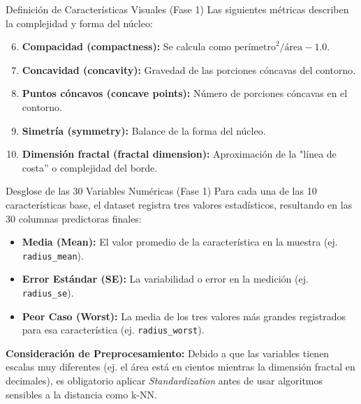 \documentclass{beamer}
\begin{document}
	\begin{frame}{Definición de Características Visuales (Fase 1)}
		Las siguientes métricas describen la complejidad y forma del núcleo:
		
		\begin{enumerate}
			\setcounter{enumi}{5}
			\item<2-> \textbf{Compacidad (compactness):} Se calcula como $\text{perímetro}^2 / \text{área} - 1.0$.
			\item<3-> \textbf{Concavidad (concavity):} Gravedad de las porciones cóncavas del contorno.
			\item<4-> \textbf{Puntos cóncavos (concave points):} Número de porciones cóncavas en el contorno.
			\item<5-> \textbf{Simetría (symmetry):} Balance de la forma del núcleo.
			\item<6-> \textbf{Dimensión fractal (fractal dimension):} Aproximación de la "línea de costa'' o complejidad del borde.
		\end{enumerate}
	\end{frame}
	
	\begin{frame}{Desglose de las 30 Variables Numéricas (Fase 1)}
		Para cada una de las 10 características base, el dataset registra tres valores estadísticos, resultando en las 30 columnas predictoras finales:
		
		\begin{itemize}
			\item<2-> \textbf{Media (Mean):} El valor promedio de la característica en la muestra (ej. \texttt{radius\_mean}).
			\item<3-> \textbf{Error Estándar (SE):} La variabilidad o error en la medición (ej. \texttt{radius\_se}).
			\item<4-> \textbf{Peor Caso (Worst):} La media de los tres valores más grandes registrados para esa característica (ej. \texttt{radius\_worst}).
		\end{itemize}
		
		\textbf{Consideración de Preprocesamiento:} Debido a que las variables tienen escalas muy diferentes (ej. el área está en cientos mientras la dimensión fractal en decimales), es obligatorio aplicar \textit{Standardization} antes de usar algoritmos sensibles a la distancia como k-NN.
	\end{frame}
	
\end{document}
